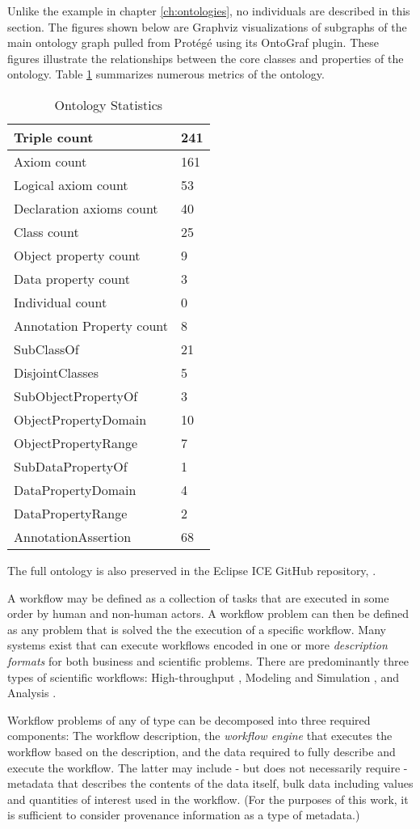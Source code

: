 Unlike the example in chapter \ref{ch:ontologies}, no individuals are described
in this section. The figures shown below are Graphviz visualizations of
subgraphs of the main ontology graph pulled from Prot\'eg\'e using its OntoGraf
plugin. These figures illustrate the relationships between the core classes and
properties of the ontology. Table \ref{ont-stats-table} summarizes numerous
metrics of the ontology.

\begin{table}[H]
\begin{tabularx}{\textwidth}{|X|X|}
\hline
Triple count & 241 \tabularnewline\hline
Axiom count	& 161	\tabularnewline\hline
Logical axiom count	& 53	\tabularnewline\hline
Declaration axioms count &	40	\tabularnewline\hline
Class count	& 25	\tabularnewline\hline
Object property count	& 9	\tabularnewline\hline
Data property count	& 3	\tabularnewline\hline
Individual count &	0	\tabularnewline\hline
Annotation Property count	& 8 \tabularnewline\hline
SubClassOf	& 21		\tabularnewline\hline
DisjointClasses  &	5 \tabularnewline\hline
SubObjectPropertyOf	& 3 \tabularnewline\hline
ObjectPropertyDomain &	10	\tabularnewline\hline
ObjectPropertyRange	& 7 \tabularnewline\hline
SubDataPropertyOf	& 1 \tabularnewline\hline
DataPropertyDomain	& 4	\tabularnewline\hline
DataPropertyRange &	2 \tabularnewline\hline
AnnotationAssertion	& 68 \tabularnewline\hline
\end{tabularx}
\caption{Ontology Statistics}
\label{ont-stats-table}
\end{table}

The full ontology is also preserved in the Eclipse ICE GitHub repository,
\cite{eclipse-ice-github}.


A workflow may be defined as a collection of tasks that are executed in some
order by human and non-human actors. A workflow problem can then be defined as
any problem that is solved the the execution of a specific workflow. Many
systems exist that can execute workflows encoded in one or more
\textit{description formats} for both business and scientific problems. There
are predominantly three types of scientific workflows: High-throughput \cite{},
Modeling and Simulation \cite{}, and Analysis \cite{}.

Workflow problems of any of type can be decomposed into three required
components: The workflow description, the \textit{workflow engine} that
executes the workflow based on the description, and the data required to fully
describe and execute the workflow. The latter may include - but does not
necessarily require - metadata that describes the contents of the data itself,
bulk data including values and quantities of interest used in the workflow.
(For the purposes of this work, it is sufficient to consider provenance
information as a type of metadata.)

